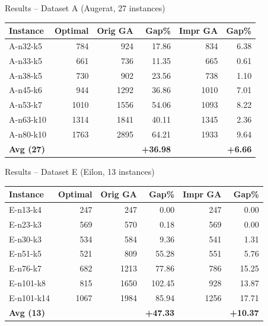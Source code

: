 \documentclass[aspectratio=169]{beamer}
\begin{document}
\begin{frame}{Results -- Dataset A (Augerat, 27 instances)}
  \begin{center}
  \small
  \begin{tabular}{lrrrrr}
    \toprule
    Instance & Optimal & Orig GA & Gap\% & Impr GA & Gap\% \\
    \midrule
    A-n32-k5  & 784  & 924  & 17.86 & 834  & 6.38 \\
    A-n33-k5  & 661  & 736  & 11.35 & 665  & 0.61 \\
    A-n38-k5  & 730  & 902  & 23.56 & 738  & 1.10 \\
    A-n45-k6  & 944  & 1292 & 36.86 & 1010 & 7.01 \\
    A-n53-k7  & 1010 & 1556 & 54.06 & 1093 & 8.22 \\
    A-n63-k10 & 1314 & 1841 & 40.11 & 1345 & 2.36 \\
    A-n80-k10 & 1763 & 2895 & 64.21 & 1933 & 9.64 \\
    \midrule
    \textbf{Avg (27)} & & & \textbf{+36.98} & & \textbf{+6.66} \\
    \bottomrule
  \end{tabular}
  \end{center}
\end{frame}

\begin{frame}{Results -- Dataset E (Eilon, 13 instances)}
  \begin{center}
  \small
  \begin{tabular}{lrrrrr}
    \toprule
    Instance & Optimal & Orig GA & Gap\% & Impr GA & Gap\% \\
    \midrule
    E-n13-k4   & 247  & 247  & 0.00   & 247  & 0.00  \\
    E-n23-k3   & 569  & 570  & 0.18   & 569  & 0.00  \\
    E-n30-k3   & 534  & 584  & 9.36   & 541  & 1.31  \\
    E-n51-k5   & 521  & 809  & 55.28  & 551  & 5.76  \\
    E-n76-k7   & 682  & 1213 & 77.86  & 786  & 15.25 \\
    E-n101-k8  & 815  & 1650 & 102.45 & 928  & 13.87 \\
    E-n101-k14 & 1067 & 1984 & 85.94  & 1256 & 17.71 \\
    \midrule
    \textbf{Avg (13)} & & & \textbf{+47.33} & & \textbf{+10.37} \\
    \bottomrule
  \end{tabular}
  \end{center}
\end{frame}
\end{document}
